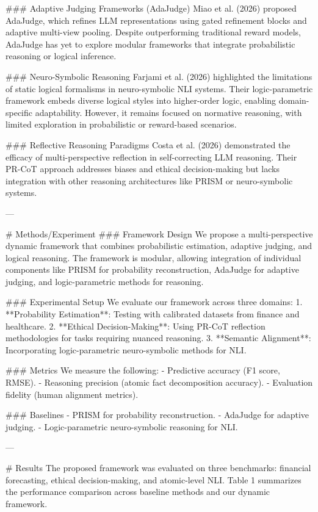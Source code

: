 ### Adaptive Judging Frameworks (AdaJudge)  
Miao et al. (2026) proposed AdaJudge, which refines LLM representations using gated refinement blocks and adaptive multi-view pooling. Despite outperforming traditional reward models, AdaJudge has yet to explore modular frameworks that integrate probabilistic reasoning or logical inference.

### Neuro-Symbolic Reasoning  
Farjami et al. (2026) highlighted the limitations of static logical formalisms in neuro-symbolic NLI systems. Their logic-parametric framework embeds diverse logical styles into higher-order logic, enabling domain-specific adaptability. However, it remains focused on normative reasoning, with limited exploration in probabilistic or reward-based scenarios.

### Reflective Reasoning Paradigms  
Costa et al. (2026) demonstrated the efficacy of multi-perspective reflection in self-correcting LLM reasoning. Their PR-CoT approach addresses biases and ethical decision-making but lacks integration with other reasoning architectures like PRISM or neuro-symbolic systems.

---

# Methods/Experiment  
### Framework Design  
We propose a multi-perspective dynamic framework that combines probabilistic estimation, adaptive judging, and logical reasoning. The framework is modular, allowing integration of individual components like PRISM for probability reconstruction, AdaJudge for adaptive judging, and logic-parametric methods for reasoning.

### Experimental Setup  
We evaluate our framework across three domains:  
1. **Probability Estimation**: Testing with calibrated datasets from finance and healthcare.  
2. **Ethical Decision-Making**: Using PR-CoT reflection methodologies for tasks requiring nuanced reasoning.  
3. **Semantic Alignment**: Incorporating logic-parametric neuro-symbolic methods for NLI.  

### Metrics  
We measure the following:  
- Predictive accuracy (F1 score, RMSE).  
- Reasoning precision (atomic fact decomposition accuracy).  
- Evaluation fidelity (human alignment metrics).  

### Baselines  
- PRISM for probability reconstruction.  
- AdaJudge for adaptive judging.  
- Logic-parametric neuro-symbolic reasoning for NLI.

---

# Results  
The proposed framework was evaluated on three benchmarks: financial forecasting, ethical decision-making, and atomic-level NLI. Table 1 summarizes the performance comparison across baseline methods and our dynamic framework.

